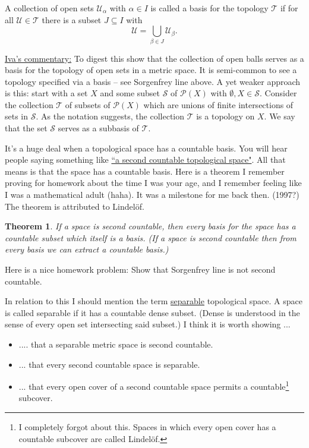 \documentclass[11pt]{amsart}
\newtheorem{theorem}{Theorem}
\newcommand{\<}{\langle}
\renewcommand{\>}{\rangle}
\newcommand{\U}{\mathcal{U}}
\newcommand{\T}{\mathcal{T}}
\begin{document}
A collection of open sets $\U_\alpha$ with $\alpha\in I$ is called a basis for the topology $\T$ if for all $\U\in \T$ there is a subset $J\subseteq I$ with 
$$\U=\bigcup_{\beta\in J}\U_\beta.$$

\noindent\underline{Iva's commentary:} To digest this show that the collection of open balls serves as a basis for the topology of open sets in a metric space. It is semi-common to see a topology specified via a basis -- see Sorgenfrey line above. A yet weaker approach is this: start with a set $X$ and some subset $\mathcal{S}$ of $\mathcal{P}(X)$ with $\emptyset, X\in \mathcal{S}$. Consider the collection $\T$ of subsets of $\mathcal{P}(X)$ which are unions of finite intersections of sets in $\mathcal{S}$. As the notation suggests, the collection $\T$ is a topology on $X$. We say that the set $\mathcal{S}$ serves as a subbasis of $\T$.

\bigbreak

It's a huge deal when a topological space has a countable basis. You will hear people saying something like \underline{``a second countable topological space"}. All that means is that the space has a countable basis. Here is a theorem I remember proving for homework about the time I was your age, and I remember feeling like I was a mathematical adult (haha). It was a milestone for me back then. (1997?) The theorem is attributed to Lindel\"of.
\begin{theorem} If a space is second countable, then every basis for the space has a countable subset which itself is a basis. (If a space is second countable then from every basis we can extract a countable basis.)
\end{theorem}
Here is a nice homework problem: Show that Sorgenfrey line is not second countable.
\bigbreak

In relation to this I should mention the term \underline{separable} topological space. A space is called separable if it has a countable dense subset. (Dense is understood in the sense of every open set intersecting said subset.) I think it is worth showing ... 

\begin{itemize}
\item .... that a separable metric space is second countable. 
\medbreak
\item ... that every second countable space is separable. 
\medbreak
\item ... that every open cover of a second countable space permits a countable\footnote{I completely forgot about this. Spaces in which every open cover has a countable subcover are called Lindel\"of.} subcover. 
\end{itemize}
\end{document}
